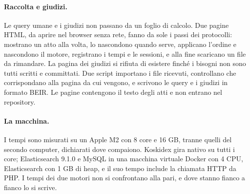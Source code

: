 \paragraph{Raccolta e giudizi.} Le query umane e i giudizi non passano da un
foglio di calcolo. Due pagine HTML, da aprire nel browser senza rete, fanno da
sole i passi dei protocolli: mostrano un atto alla volta, lo nascondono quando
serve, applicano l'ordine e nascondono il motore, registrano i tempi e le
sessioni, e alla fine scaricano un file da rimandare. La pagina dei giudizi si
rifiuta di esistere finché i bisogni non sono tutti scritti e committati. Due
script importano i file ricevuti, controllano che corrispondano alla pagina da cui
vengono, e scrivono le query e i giudizi in formato BEIR. Le pagine contengono il
testo degli atti e non entrano nel repository.

\paragraph{La macchina.} I tempi sono misurati su un Apple M2 con 8 core e
16 GB, tranne quelli del secondo computer, dichiarati dove compaiono. Koskidex gira nativo su tutti i core; Elasticsearch 9.1.0 e MySQL in una
macchina virtuale Docker con 4 CPU, Elasticsearch con 1 GB di heap, e il suo
tempo include la chiamata HTTP da PHP. I tempi dei due motori non si confrontano
alla pari, e dove stanno fianco a fianco lo si scrive.
